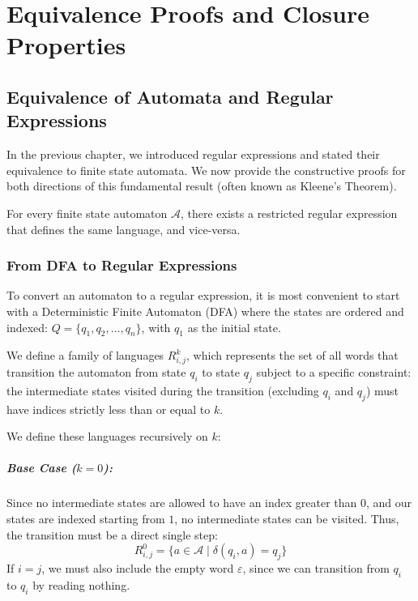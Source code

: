 \chapter{Equivalence Proofs and Closure Properties}

\section{Equivalence of Automata and Regular Expressions}

In the previous chapter, we introduced regular expressions and stated their equivalence to finite state automata. We now provide the constructive proofs for both directions of this fundamental result (often known as Kleene's Theorem).

\begin{theorem}
For every finite state automaton $\mathcal{A}$, there exists a restricted regular expression that defines the same language, and vice-versa.
\end{theorem}

\subsection{From DFA to Regular Expressions}

To convert an automaton to a regular expression, it is most convenient to start with a Deterministic Finite Automaton (DFA) where the states are ordered and indexed: $Q = \{q_1, q_2, \dots, q_n\}$, with $q_1$ as the initial state.

We define a family of languages $R_{i,j}^k$, which represents the set of all words that transition the automaton from state $q_i$ to state $q_j$ subject to a specific constraint: the intermediate states visited during the transition (excluding $q_i$ and $q_j$) must have indices strictly less than or equal to $k$.

We define these languages recursively on $k$:

\paragraph{Base Case ($k=0$):} Since no intermediate states are allowed to have an index greater than $0$, and our states are indexed starting from $1$, no intermediate states can be visited. Thus, the transition must be a direct single step:
\[
R_{i,j}^0 = \{ a \in \mathcal{A} \mid \delta(q_i, a) = q_j \}
\]
If $i = j$, we must also include the empty word $\varepsilon$, since we can transition from $q_i$ to $q_i$ by reading nothing.

